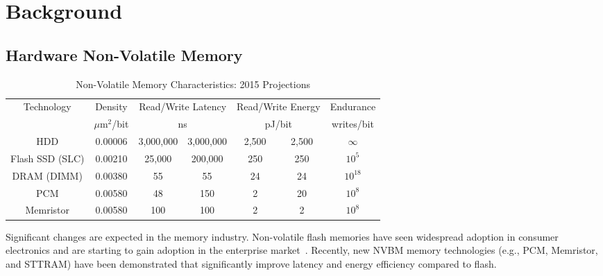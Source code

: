 \chapter{Background}
\label{sec:background}


\section{Hardware Non-Volatile Memory}




\begin{table*}[t]
\begin{small}
\begin{center}
\begin{tabular}{c|cccccc}
Technology & Density 	& \multicolumn{2}{c}{Read/Write Latency} & \multicolumn{2}{c}{Read/Write Energy} & Endurance \\
           & $\mu$m$^2$/bit & \multicolumn{2}{c}{ns}                 & \multicolumn{2}{c}{pJ/bit}  & writes/bit\\
\hline
HDD & 0.00006 & 3,000,000 & 3,000,000 & 2,500 & 2,500 & $\infty$ \\
Flash SSD (SLC) & 0.00210 & 25,000 & 200,000 & 250 & 250 & $10^5$ \\
DRAM (DIMM) & 0.00380  & 55 & 55 & 24 & 24 & $10^{18}$ \\
PCM & 0.00580 & 48 & 150 & 2 & 20 & $10^8$ \\
Memristor & 0.00580  & 100 & 100 & 2 & 2 & $10^8$
\end{tabular}
\end{center}
\end{small}
\caption{Non-Volatile Memory Characteristics: 2015 Projections}
\label{tab:nvbm}
\end{table*}

Significant changes are expected in the memory industry. Non-volatile
flash memories have seen widespread adoption in consumer electronics
and are starting to gain adoption in the enterprise
market~\citep{FusionIO}.  Recently, new NVBM memory technologies
(e.g., PCM, Memristor, and STTRAM) have been demonstrated that
significantly improve latency and energy efficiency compared to flash.


